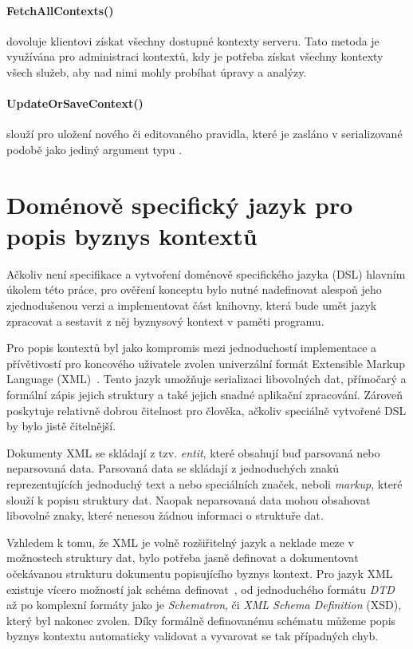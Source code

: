 \paragraph{FetchAllContexts()} dovoluje klientovi získat všechny
dostupné kontexty serveru. Tato metoda je využívána pro administraci
kontextů, kdy je potřeba získat všechny kontexty všech služeb, aby
nad nimi mohly probíhat úpravy a analýzy.

\paragraph{UpdateOrSaveContext()} slouží pro uložení nového či
editovaného pravidla, které je zasláno v serializované podobě
jako jediný argument typu .

\section{Doménově specifický jazyk pro popis byznys kontextů}\label{sec:dsl-impl}

Ačkoliv není specifikace a vytvoření doménově specifického jazyka (DSL)
hlavním úkolem této práce, pro ověření konceptu bylo nutné nadefinovat
alespoň jeho zjednodušenou verzi a implementovat část knihovny, která
bude umět jazyk zpracovat a sestavit z něj byznysový kontext v paměti programu.

Pro popis kontextů byl jako kompromis mezi jednoduchostí implementace
a přívětivostí pro koncového uživatele zvolen univerzální formát Extensible
Markup Language (XML)~\cite{bray1997extensible}. Tento
jazyk umožňuje serializaci libovolných dat, přímočarý a formální
zápis jejich struktury a také jejich snadné aplikační zpracování.
Zároveň poskytuje relativně dobrou čitelnost pro člověka, ačkoliv
speciálně vytvořené DSL by bylo jistě čitelnější.

Dokumenty XML se skládají z tzv. \textit{entit}, které obsahují
buď parsovaná nebo neparsovaná data. Parsovaná data se skládají
z jednoduchých znaků reprezentujících jednoduchý text a nebo
speciálních značek, neboli \textit{markup}, které slouží k popisu
struktury dat. Naopak neparsovaná data mohou obsahovat libovolné
znaky, které nenesou žádnou informaci o struktuře dat.

Vzhledem k tomu, že XML je volně rozšiřitelný jazyk a neklade
meze v možnostech struktury dat, bylo potřeba jasně definovat
a dokumentovat očekávanou strukturu dokumentu popisujícího
byznys kontext. Pro jazyk XML existuje vícero možností jak schéma
definovat~\cite{lee2000comparative}, od jednoduchého formátu
\textit{DTD} až po komplexní formáty jako je \textit{Schematron}, či
\textit{XML Schema Definition} (XSD), který byl nakonec zvolen.
Díky formálně definovanému schématu můžeme popis byznys kontextu
automaticky validovat a vyvarovat se tak případných chyb.


